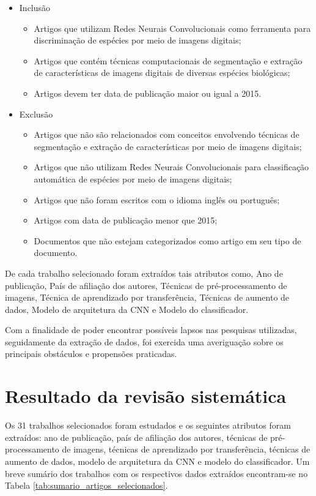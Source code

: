\documentclass[
	12pt,				%
	oneside,			%
	a4paper,			%
	english,			%
	brazil				%
	]{abntex2ppgsi}
\begin{document}
\begin{itemize}
  \item Inclusão
    \begin{itemize}
        \item{Artigos que utilizam Redes Neurais Convolucionais como ferramenta para discriminação de espécies por meio de imagens digitais;}
        \item{Artigos que contém técnicas computacionais de segmentação e extração de características de imagens digitais de diversas espécies biológicas;}
        \item{Artigos devem ter data de publicação maior ou igual a 2015.}
    \end{itemize}
  \item Exclusão
    \begin{itemize}
        \item{Artigos que não são relacionados com conceitos envolvendo técnicas de segmentação e extração de características por meio de imagens digitais;}
        \item{Artigos que não utilizam Redes Neurais Convolucionais para classificação automática de espécies por meio de imagens digitais;}
        \item{Artigos que não foram escritos com o idioma inglês ou português;}
        \item{Artigos com data de publicação menor que 2015;}
        \item{Documentos que não estejam categorizados como artigo em seu tipo de documento.}
    \end{itemize}
\end{itemize}

De cada trabalho selecionado foram extraídos tais atributos como, Ano de publicação, País de afiliação dos autores, Técnicas de pré-processamento de imagens, Técnica de aprendizado por transferência, Técnicas de aumento de dados, Modelo de arquitetura da CNN e Modelo do classificador.

Com a finalidade de poder encontrar possíveis lapsos nas pesquisas utilizadas, seguidamente da extração de dados, foi exercida uma averiguação sobre os principais obstáculos e propensões praticadas.

\section{Resultado da revisão sistemática}
Os 31 trabalhos selecionados foram estudados e os seguintes atributos foram extraídos: ano de publicação, país de afiliação dos autores, técnicas de pré-processamento de imagens, técnicas de aprendizado por transferência, técnicas de aumento de dados, modelo de arquitetura da CNN e modelo do classificador. Um breve sumário dos trabalhos com os respectivos dados extraídos encontram-se no Tabela \ref{tab:sumario_artigos_selecionados}.
  
\end{document}
